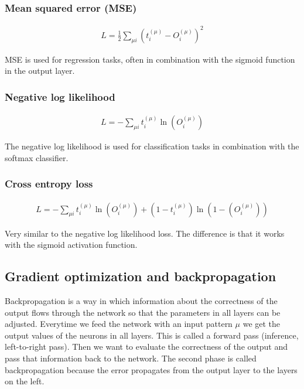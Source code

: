 \subsubsection{Mean squared error (MSE)}

\begin{gather}
	L =  \frac{1}{2} \sum\limits_{\mu i} \left( t_{i}^{(\mu)} - O_{i}^{(\mu)} \right)^2
\end{gather}

MSE is used for regression tasks, often in combination with the sigmoid function in the output layer. \cite{groman}

\subsubsection{Negative log likelihood} 

\begin{gather}
	L = - \sum\limits_{\mu i}  t_{i}^{(\mu)} \ln (O_{i}^{(\mu)})
\end{gather}

The negative log likelihood is used for classification tasks in combination with the softmax classifier. \cite{mehlig}

\subsubsection{Cross entropy loss} 

\begin{gather}
	L = - \sum\limits_{\mu i}  t_{i}^{(\mu)} \ln (O_{i}^{(\mu)}) + (1 - t_{i}^{(\mu)}) \ln (1 - (O_{i}^{(\mu)}))
\end{gather}

Very similar to the negative log likelihood loss. The difference is that it works with the sigmoid activation function. \cite{mehlig}

\newpage
\subsection{Gradient optimization and backpropagation}

Backpropagation is a way in which information about the correctness of the output flows through the network so that the parameters in all layers can be adjusted. Everytime we feed the network with an input pattern $ \mu $ we get the output values of the neurons in all layers. This is called a forward pass (inference, left-to-right pass). Then we want to evaluate the correctness of the output and pass that information back to the network. The second phase is called backpropagation because the error propagates from the output layer to the layers on the left. \cite{mehlig}

